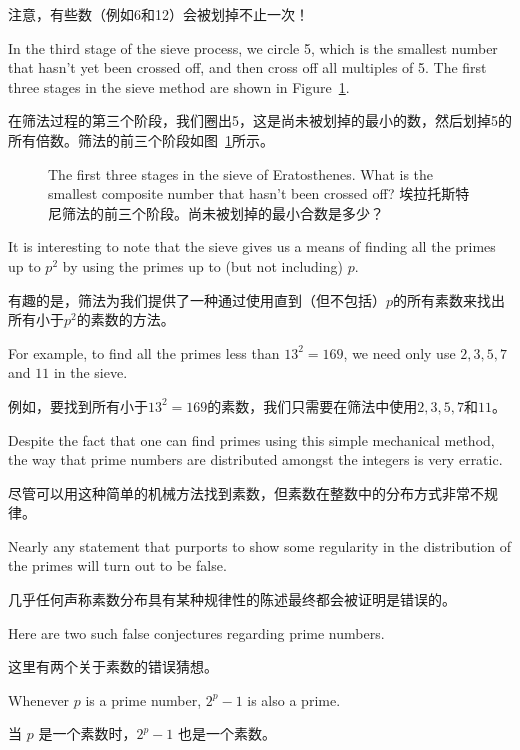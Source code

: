 注意，有些数（例如6和12）会被划掉不止一次！

In the third stage of the sieve process, we circle
5, which is the smallest number that hasn't yet been crossed off, and
then cross off all multiples of 5.  The first three stages in the
sieve method are shown in Figure~\ref{fig:sieve}.

在筛法过程的第三个阶段，我们圈出5，这是尚未被划掉的最小的数，然后划掉5的所有倍数。筛法的前三个阶段如图~\ref{fig:sieve}所示。

\begin{figure}[!hbtp]

\caption[The sieve of Eratosthenes.埃拉托斯特尼筛法]{The first three stages in the %
sieve of Eratosthenes. What is the smallest composite number that %
hasn't been crossed off? 埃拉托斯特尼筛法的前三个阶段。尚未被划掉的最小合数是多少？}
\label{fig:sieve} 
\end{figure}

It is interesting to note that the sieve gives us a means of finding
all the primes up to $p^2$ by using the primes up to (but not
including) $p$.

有趣的是，筛法为我们提供了一种通过使用直到（但不包括）$p$的所有素数来找出所有小于$p^2$的素数的方法。

For
example, to find all the primes less than $13^2 = 169$, we need only
use $2, 3, 5, 7$ and $11$ in the sieve.

例如，要找到所有小于$13^2 = 169$的素数，我们只需要在筛法中使用$2, 3, 5, 7$和$11$。

Despite the fact that one can find primes using this simple 
mechanical method, the way that prime numbers are distributed
amongst the integers is very erratic.

尽管可以用这种简单的机械方法找到素数，但素数在整数中的分布方式非常不规律。

Nearly any statement that
purports to show some regularity in the distribution of the 
primes will turn out to be false.

几乎任何声称素数分布具有某种规律性的陈述最终都会被证明是错误的。

Here are two such false
conjectures regarding prime numbers.

这里有两个关于素数的错误猜想。

\begin{conj} \label{conj:ferm}
Whenever $p$ is a prime number, $2^p-1$ is also a prime.


当 $p$ 是一个素数时，$2^p-1$ 也是一个素数。
\end{conj}

